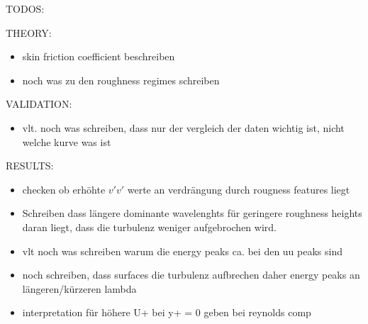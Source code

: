 TODOS:

THEORY:
\begin{itemize}
    \item skin friction coefficient beschreiben
    \item noch was zu den roughness regimes schreiben
\end{itemize}
VALIDATION:
\begin{itemize}
    \item vlt. noch was schreiben, dass nur der vergleich der daten wichtig ist, nicht welche kurve was ist
\end{itemize}
RESULTS: 
\begin{itemize}
    \item checken ob erhöhte $v'v'$ werte an verdrängung durch rougness features liegt
    \item Schreiben dass längere dominante wavelenghts für geringere roughness heights daran liegt, dass die turbulenz weniger aufgebrochen wird.
    \item vlt noch was schreiben warum die energy peaks ca. bei den uu peaks sind
    \item noch schreiben, dass surfaces die turbulenz aufbrechen daher energy peaks an längeren/kürzeren lambda
    \item interpretation für höhere U+ bei y+ = 0 geben bei reynolds comp
\end{itemize}
